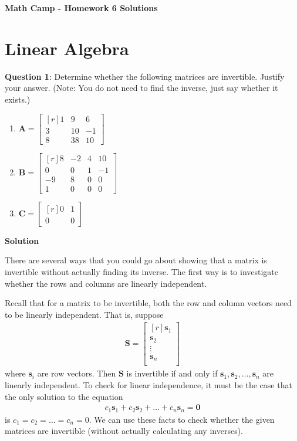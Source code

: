 \documentclass[10pt]{amsart}
\begin{document}
\centerline{\bf Math Camp - Homework 6 Solutions}


\section{Linear Algebra}


\textbf{Question 1}: Determine  whether the following matrices are invertible. Justify your answer. (Note: You do not need to find the inverse, just say whether it exists.)

\begin{multicols}{3}
	\begin{enumerate}
		\item $\mathbf{A} = \left[\begin{matrix*}[r]
		1 & 9 & 6 \\
		3 & 10 & -1 \\
		8 & 38 & 10
		\end{matrix*}\right]$
		
		\item $\mathbf{B} = \left[\begin{matrix*}[r]
		8 & -2 & 4 & 10 \\
		0 & 0 & 1 & -1 \\
		-9 & 8 & 0 & 0 \\
		1 & 0 & 0 & 0
		\end{matrix*}\right]$
		
		\item $\mathbf{C} = \left[\begin{matrix*}[r]
		0 & 1 \\
		0 & 0
		\end{matrix*}\right]$
	\end{enumerate}
\end{multicols}

\textbf{Solution}

There are several ways that you could go about showing that a matrix is invertible without actually finding its inverse. The first way is to investigate whether the rows and columns are linearly independent. 

Recall that for a matrix to be invertible, both the row and column vectors need to be linearly independent. That is, suppose 
\begin{align*}
\mathbf{S} = \left[\begin{matrix*}[r]
\mathbf{s}_1 \\
\mathbf{s}_2 \\
\vdots \\
\mathbf{s}_n \\
\end{matrix*}\right]
\end{align*} where $\mathbf{s}_i$ are row vectors. Then $\mathbf{S}$ is invertible if and only if $\mathbf{s}_1, \mathbf{s}_2, \dots, \mathbf{s}_n$ are linearly independent.  To check for linear independence, it  must be the case that the only solution to the equation
\begin{align*}
c_1 \mathbf{s}_1 + c_2 \mathbf{s}_2 + \dots + c_n \mathbf{s}_n =\mathbf{ 0}
\end{align*}
is $c_1 = c_2 = \dots = c_n = 0$. We can use these facts to check whether the given matrices are invertible (without actually calculating any inverses). 
\end{document}
